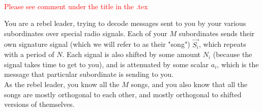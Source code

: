 
\\


\textcolor{red}{Please see comment under the title in the .tex}

You are a rebel leader, trying to decode messages sent to you by your various subordinates over special radio signals. Each of your $M$ subordinates sends their own signature signal (which we will refer to as their "song") $\vec{S_i}$, which repeats with a period of $N$. Each signal is also shifted by some amount $N_i$ (because the signal takes time to get to you), and is attenuated by some scalar $a_i$, which is the message that particular subordinate is sending to you. \\

As the rebel leader, you know all the $M$ songs, and you also know that all the songs are mostly orthogonal to each other, and mostly orthogonal to shifted versions of themselves. \\

